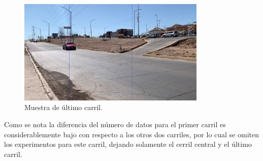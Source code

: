 \begin{figure}[H]
    \centering
    \includegraphics[width=0.8\textwidth]{Resultados/imgs/carril_2.jpg}
    \caption{Muestra de último carril.}
    \label{fig:carril_2}
\end{figure}

Como se nota la diferencia del número de datos para el primer carril es considerablemente bajo con respecto a los otros dos carriles, por lo cual se omiten los experimentos para este carril, dejando solamente el cerril central y el último carril.
